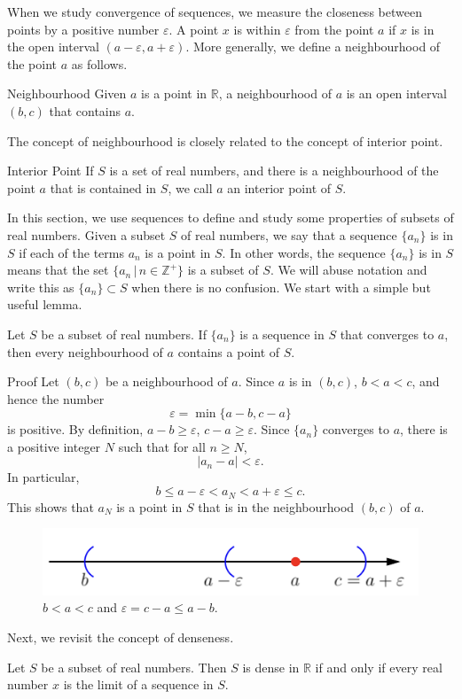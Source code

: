 When we study convergence of sequences, we measure the closeness between points  by a positive number $\varepsilon$. A point $x$ is within $\varepsilon$ from the point $a$ if $x$ is in the open interval $(a-\varepsilon, a+\varepsilon)$. More generally, we define a neighbourhood of the point $a$ as follows.
\begin{definition}{Neighbourhood}
Given $a$ is a point in $\mathbb{R}$, a neighbourhood of $a$ is an open interval $(b, c)$ that contains $a$.
\end{definition}
The concept of neighbourhood is closely related to the concept of interior point. 
\begin{definition}{Interior Point}
 If $S$ is a set of real numbers, and there is a neighbourhood of the point $a$ that is contained in $S$, we call $a$ an interior point of $S$.
\end{definition}
In this section, we use sequences to define and  study some properties of subsets of real numbers. Given a subset $S$ of real numbers, we say that a sequence $\{a_n\}$ is in $S$ if each of the terms $a_n$  is  a point in $S$. In other words, the sequence $\{a_n\}$ is in $S$ means that the set $\{a_n\,|\,n\in\mathbb{Z}^+\}$ is a subset of $S$. We will abuse notation and write this as $\{a_n\}\subset S$ when there is no confusion.
We start with a simple but useful lemma.
\begin{lemma}[label=23020505]{}
Let $S$ be a subset of real numbers. If $\{a_n\}$ is a sequence in $S$ that converges to $a$, then every neighbourhood of $a$ contains a point of $S$.
\end{lemma}
\begin{myproof}{Proof}
Let $(b, c)$ be a neighbourhood of $a$. Since $a$ is in $(b,c)$,  $b<a<c$, and hence the number
\[\varepsilon=\min\{a-b, c-a\}\] is positive. 
By definition, $a-b\geq\varepsilon$, $c-a\geq\varepsilon$. 
Since $\{a_n\}$ converges to $a$, there is a positive integer $N$ such that for all $n\geq N$, 
\[|a_n-a|<\varepsilon.\]
In particular,
\[b\leq a-\varepsilon<a_N<a+\varepsilon\leq c.\]This shows that $a_N$ is a point in $S$ that is in the neighbourhood $(b, c)$ of $a$. 
\end{myproof}
 \begin{figure}[ht]
\centering
\includegraphics[scale=0.2]{Picture4.png}

\caption{  $b<a<c$ and $\varepsilon=c-a\leq a-b$.}\label{figure4}
\end{figure}
Next, we revisit the concept of denseness.
\begin{theorem}[label=23020409]{}
Let $S$ be a subset of real numbers. Then $S$ is dense in $\mathbb{R}$  if and only if every real number $x$ is the limit of a sequence in $S$.
\end{theorem}

